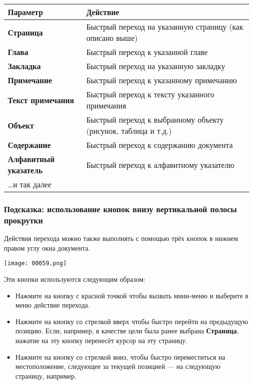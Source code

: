 \documentclass[a4paper,10pt]{article}
\begin{document}
\begin{center}
\begin{tabular}{ | m{5cm} | m{9cm} | }
\hline
 \textbf{Параметр} & \textbf{Действие} \\ 
 \hline
 \textbf{Страница} & Быстрый переход на указанную страницу (как описано выше)\\
\hline
\textbf{Глава} & Быстрый переход к указанной главе\\
\hline
\textbf{Закладка} & Быстрый переход на указанную закладку\\
\hline
\textbf{Примечание} & Быстрый переход к указанному примечанию\\
\hline
\textbf{Текст примечания} & Быстрый переход к тексту указанного примечания\\
\hline
\textbf{Объект} & Быстрый переход к выбранному объекту (рисунок, таблица и т.д.)\\
\hline
\textbf{Содержание} & Быстрый переход к содержанию документа\\
\hline
\textbf{Алфавитный указатель} & Быстрый переход к алфавитному указателю\\
\hline
…и так далее &  \\
\hline
\end{tabular}
\end{center}

\subsubsection{Подсказка: использование кнопок внизу вертикальной полосы прокрутки}
Действия перехода можно также выполнять с помощью трёх кнопок в нижнем правом углу окна документа.

\texttt{[image: 00059.png]}

Эти кнопки используются следующим образом:
\begin{itemize}
 \item Нажмите на кнопку с красной точкой чтобы вызвать мини-меню и выберите в меню действие перехода.
 \item Нажмите на кнопку со стрелкой вверх чтобы быстро перейти на предыдущую позицию. Если, например, в качестве цели была ранее выбрана \textbf{Страница}, нажатие на эту кнопку перенесёт курсор на эту страницу.
 \item Нажмите на кнопку со стрелкой вниз, чтобы быстро переместиться на местоположение, следующее за текущей позицией --- на следующую страницу, например.
\end{itemize}
\end{document}
